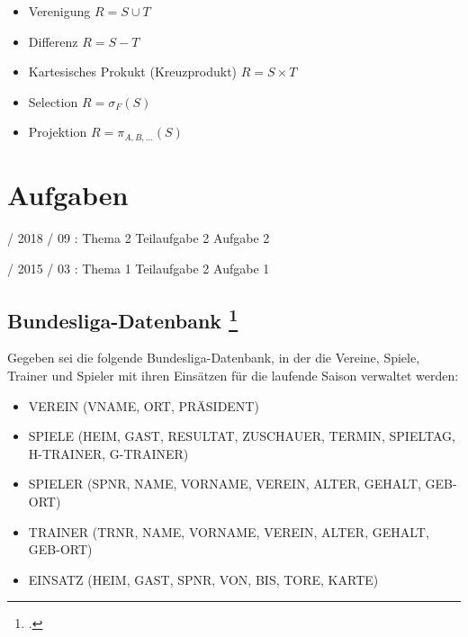 \documentclass{lehramt-informatik-haupt}
\begin{document}
\begin{itemize}
\item Verenigung $R = S \cup T$
\item Differenz $R = S - T$
\item Kartesisches Prokukt (Kreuzprodukt) $R = S \times T$
\item Selection $R = \sigma_F(S)$
\item Projektion $R = \pi_{A,B,...}(S)$
\end{itemize}


\chapter{Aufgaben}

%

 / 2018 / 09 : Thema 2 Teilaufgabe 2 Aufgabe 2

%

 / 2015 / 03 : Thema 1 Teilaufgabe 2 Aufgabe 1

%

\section{Bundesliga-Datenbank
\footcite[Aufgabe 4: Relationale Algebra und SQL]{db:ab:7}}

Gegeben sei die folgende Bundesliga-Datenbank, in der die Vereine,
Spiele, Trainer und Spieler mit ihren Einsätzen für die laufende Saison
verwaltet werden:

\begin{itemize}
\item VEREIN (VNAME, ORT, PRÄSIDENT)
\item SPIELE (HEIM, GAST, RESULTAT, ZUSCHAUER, TERMIN, SPIELTAG, H-TRAINER,
G-TRAINER)
\item SPIELER (SPNR, NAME, VORNAME, VEREIN, ALTER, GEHALT, GEB-ORT)
\item TRAINER (TRNR, NAME, VORNAME, VEREIN, ALTER, GEHALT, GEB-ORT)
\item EINSATZ (HEIM, GAST, SPNR, VON, BIS, TORE, KARTE)
\end{itemize}
\end{document}

